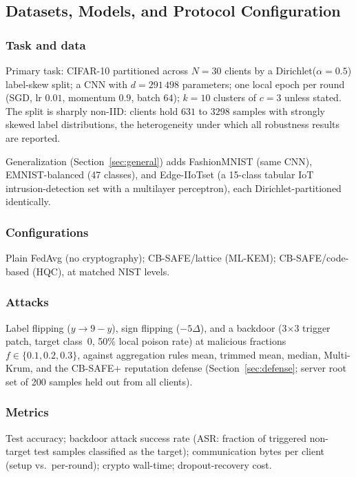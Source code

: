 \documentclass[lettersize,journal]{IEEEtran}
\begin{document}
\subsection{Datasets, Models, and Protocol Configuration}
\subsubsection{Task and data} Primary task: CIFAR-10 partitioned across $N{=}30$ clients
by a Dirichlet($\alpha{=}0.5$) label-skew split; a CNN with $d{=}291\,498$
parameters; one local epoch per round (SGD, lr $0.01$, momentum $0.9$, batch $64$);
$k{=}10$ clusters of $c{=}3$ unless stated. The split is sharply non-IID: clients
hold $631$ to $3298$ samples with strongly skewed label distributions, the
heterogeneity under which all robustness results are reported.

Generalization (Section~\ref{sec:general})
adds FashionMNIST (same CNN), EMNIST-balanced (47 classes), and Edge-IIoTset (a 15-class tabular IoT
intrusion-detection set with a multilayer perceptron), each Dirichlet-partitioned
identically. \subsubsection{Configurations} Plain FedAvg (no
cryptography); CB-SAFE/lattice (ML-KEM); CB-SAFE/code-based (HQC), at matched NIST
levels. \subsubsection{Attacks} Label flipping ($y \to 9-y$), sign flipping
($-5\Delta$), and a backdoor \cite{bagdasaryan2020} (3$\times$3 trigger patch,
target class~0, 50\% local poison rate) at malicious fractions $f \in \{0.1, 0.2, 0.3\}$, against aggregation
rules mean, trimmed mean, median, Multi-Krum, and the CB-SAFE+ reputation defense
(Section~\ref{sec:defense}; server root set of 200 samples held out from all
clients). \subsubsection{Metrics} Test accuracy;
backdoor attack success rate (ASR: fraction of triggered non-target test samples
classified as the target); communication bytes per client (setup vs.\ per-round);
crypto wall-time; dropout-recovery cost.
\end{document}

